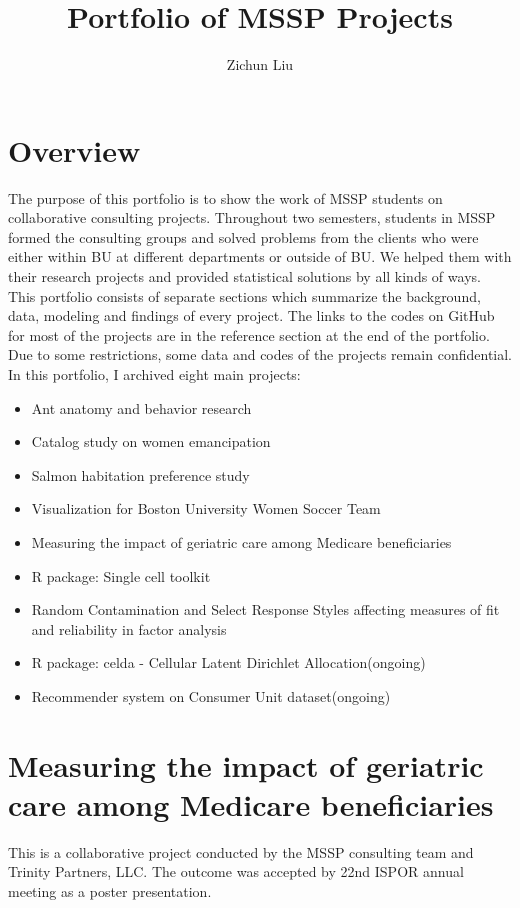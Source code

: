 \documentclass{article}
\title{Portfolio of MSSP Projects}
\author{Zichun Liu}
\begin{document}
	\maketitle
	\tableofcontents
	\section{Overview}
	The purpose of this portfolio is to show the work of MSSP students on collaborative consulting projects. Throughout two semesters, students in MSSP formed the consulting groups and solved problems from the clients who were either within BU at different departments or outside of BU. We helped them with their research projects and provided statistical solutions by all kinds of ways. This portfolio consists of separate sections which summarize the background, data, modeling and findings of every project. The links to the codes on GitHub for most of the projects are in the reference section at the end of the portfolio. Due to some restrictions, some data and codes of the projects remain confidential. In this portfolio, I archived eight main projects:
	\begin{itemize}
		\item Ant anatomy and behavior research
		\item Catalog study on women emancipation
		\item Salmon habitation preference study
		\item Visualization for Boston University Women Soccer Team
		\item Measuring the impact of geriatric care among Medicare beneficiaries
		\item R package: Single cell toolkit
		\item Random Contamination and Select Response Styles affecting measures of fit and reliability in factor analysis
		\item R package: celda - Cellular Latent Dirichlet Allocation(ongoing)
		\item Recommender system on Consumer Unit dataset(ongoing)		
	\end{itemize}

	\section{Measuring the impact of geriatric care among Medicare beneficiaries}
	This is a collaborative project conducted by the MSSP consulting team and Trinity Partners, LLC. The outcome was accepted by 22nd ISPOR annual meeting as a poster presentation. 
\end{document}
